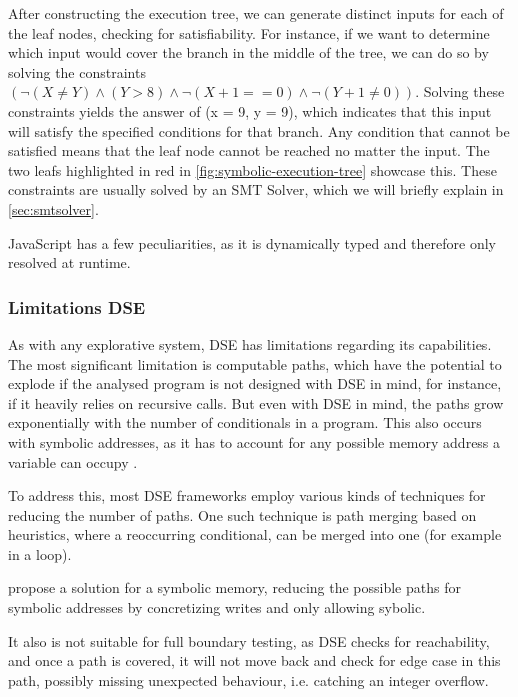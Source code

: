After constructing the execution tree, we can generate distinct inputs for each of the leaf nodes, checking for satisfiability.
For instance, if we want to determine which input would cover the branch in the middle of the tree, we can do so by solving the constraints  $(\neg(X \neq Y) \land (Y > 8) \land \neg( X+1==0 ) \land \neg(Y+1 \neq 0 ))$. 
Solving these constraints yields the answer of (x = 9, y = 9), which indicates that this input will satisfy the specified conditions for that branch. 
Any condition that cannot be satisfied means that the leaf node cannot be reached no matter the input. The two leafs highlighted in red in  \autoref{fig:symbolic-execution-tree} showcase this.
These constraints are usually solved by an SMT Solver, which we will briefly explain in \autoref{sec:smtsolver}.


JavaScript has a few peculiarities, as it is dynamically typed and therefore only resolved at runtime. 

\subsubsection{Limitations DSE}

As with any explorative system, DSE has limitations regarding its capabilities. 
The most significant limitation is computable paths, which have the potential to explode if the analysed program is not designed with DSE in mind, for instance, if it heavily relies on recursive calls. 
But even with DSE in mind, the paths grow exponentially with the number of conditionals in a program.  \cite{cadar_symbolic_2013}
This also occurs with symbolic addresses, as it has to account for any possible memory address a variable can occupy \cite{elkarablieh_precise_2009}.  

To address this, most DSE frameworks employ various kinds of techniques for reducing the number of paths. 
One such technique is path merging based on heuristics, where a reoccurring conditional, can be merged into one (for example in a loop).\cite{kuznetsov_efficient_nodate}

\citet{cha_unleashing_2012} propose a solution for a symbolic memory, reducing the possible paths for symbolic addresses by concretizing writes and only allowing sybolic.    

It also is not suitable for full boundary testing, as DSE checks for reachability, and once a path is covered, it will not move back and check for edge case in this path, possibly missing unexpected behaviour, i.e. catching an integer overflow.\cite{berthier_efficient_2023}


